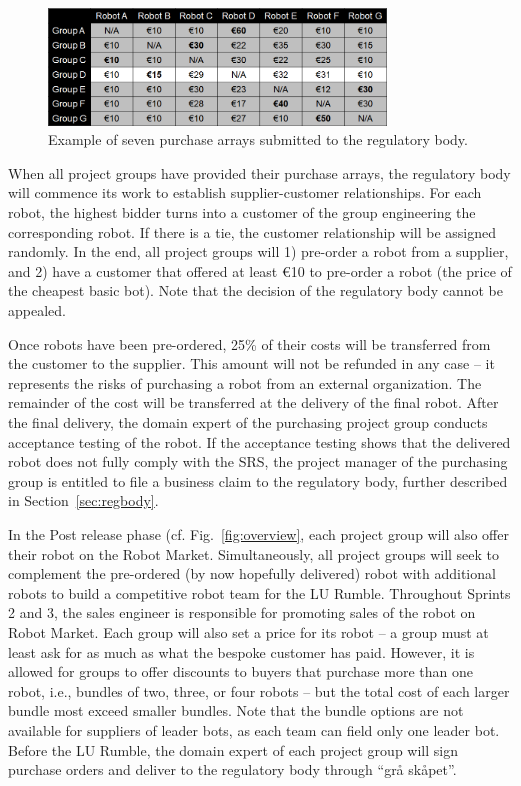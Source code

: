 \documentclass{scrreprt}
\begin{document}
\begin{figure}
\centering
\includegraphics[width=0.80\textwidth]{figures/purchaseArray.png}
\caption{Example of seven purchase arrays submitted to the regulatory body.}
\label{fig:array}
\end{figure}

When all project groups have provided their purchase arrays, the regulatory body will commence its work to establish supplier-customer relationships. For each robot, the highest bidder turns into a customer of the group engineering the corresponding robot. If there is a tie, the customer relationship will be assigned randomly. In the end, all project groups will 1) pre-order a robot from a supplier, and 2) have a customer that offered at least \euro 10 to pre-order a robot (the price of the cheapest basic bot). Note that the decision of the regulatory body cannot be appealed. 

Once robots have been pre-ordered, 25\% of their costs will be transferred from the customer to the supplier. This amount will not be refunded in any case -- it represents the risks of purchasing a robot from an external organization. The remainder of the cost will be transferred at the delivery of the final robot. After the final delivery, the domain expert of the purchasing project group conducts acceptance testing of the robot. If the acceptance testing shows that the delivered robot does not fully comply with the SRS, the project manager of the purchasing group is entitled to file a business claim to the regulatory body, further described in Section~\ref{sec:regbody}.

In the Post release phase (cf. Fig.~\ref{fig:overview}, each project group will also offer their robot on the Robot Market. Simultaneously, all project groups will seek to complement the pre-ordered (by now hopefully delivered) robot with additional robots to build a competitive robot team for the LU Rumble. Throughout Sprints 2 and 3, the sales engineer is responsible for promoting sales of the robot on Robot Market. Each group will also set a price for its robot -- a group must at least ask for as much as what the bespoke customer has paid. However, it is allowed for groups to offer discounts to buyers that purchase more than one robot, i.e., bundles of two, three, or four robots -- but the total cost of each larger bundle most exceed smaller bundles. Note that the bundle options are not available for suppliers of leader bots, as each team can field only one leader bot. Before the LU Rumble, the domain expert of each project group will sign purchase orders and deliver to the regulatory body through ``grå skåpet''. 
\end{document}
